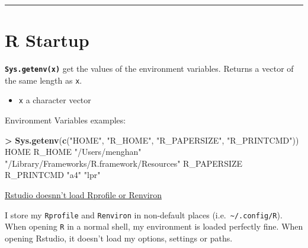 \documentclass[
]{book}
\newenvironment{Shaded}{\begin{snugshade}}{\end{snugshade}}
\newcommand{\FunctionTok}[1]{\textcolor[rgb]{0.13,0.29,0.53}{\textbf{#1}}}
\newcommand{\NormalTok}[1]{#1}
\newcommand{\SpecialCharTok}[1]{\textcolor[rgb]{0.81,0.36,0.00}{\textbf{#1}}}
\newcommand{\StringTok}[1]{\textcolor[rgb]{0.31,0.60,0.02}{#1}}
\providecommand{\tightlist}{%
  \setlength{\itemsep}{0pt}\setlength{\parskip}{0pt}}
\theoremstyle{definition}
\theoremstyle{definition}
\theoremstyle{definition}
\theoremstyle{definition}
\theoremstyle{remark}
\begin{document}
\begin{center}\rule{0.5\linewidth}{0.5pt}\end{center}

\section{R Startup}\label{r-startup}

\textbf{\texttt{Sys.getenv(x)}} get the values of the environment variables. Returns a vector of the same length as \texttt{x}.

\begin{itemize}
\tightlist
\item
  \texttt{x} a character vector
\end{itemize}

Environment Variables examples:

\begin{Shaded}
\begin{Highlighting}[]
\SpecialCharTok{\textgreater{}} \FunctionTok{Sys.getenv}\NormalTok{(}\FunctionTok{c}\NormalTok{(}\StringTok{"HOME"}\NormalTok{, }\StringTok{"R\_HOME"}\NormalTok{, }\StringTok{"R\_PAPERSIZE"}\NormalTok{, }\StringTok{"R\_PRINTCMD"}\NormalTok{))}
\NormalTok{           HOME                                      R\_HOME }
\StringTok{"/Users/menghan"} \StringTok{"/Library/Frameworks/R.framework/Resources"} 
\NormalTok{    R\_PAPERSIZE                                  R\_PRINTCMD }
           \StringTok{"a4"}                                       \StringTok{"lpr"} 
\end{Highlighting}
\end{Shaded}

\href{https://community.rstudio.com/t/rstudio-doesnnt-load-rprofile-or-renviron/57721}{Rstudio doesnn't load Rprofile or Renviron}

I store my \texttt{Rprofile} and \texttt{Renviron} in non-default places (i.e.~\texttt{\textasciitilde{}/.config/R}). When opening \texttt{R} in a normal shell, my environment is loaded perfectly fine. When opening Rstudio, it doesn't load my options, settings or paths.
\end{document}
